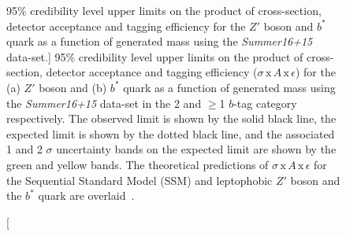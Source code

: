 \begin{figure}[!htb]
  \centering
  \captionsetup[subfigure]{aboveskip=0pt,justification=centering}
  \caption
      [95\% credibility level upper limits on the product of cross-section, detector acceptance and tagging efficiency
        for the $Z'$ boson and $b^*$ quark as a function of generated mass
        using the \textit{Summer16+15} data-set.]
      {95\% credibility level upper limits on
        the product of cross-section, detector acceptance and tagging efficiency ($\sigma\,\text{x}\,\mathit{A}\,\text{x}\,\epsilon$)
        for the (a) $Z'$ boson and (b) $b^*$ quark  as a function of generated mass
        using the \textit{Summer16+15} data-set in the 2 and $\geq$1 $b$-tag category respectively.
        The observed limit is shown by the solid black line,
        the expected limit is shown by the dotted black line,
        and the associated 1 and 2 $\sigma$ uncertainty bands on the expected limit are shown by the green and yellow bands.
        The theoretical predictions of $\sigma\,\text{x}\,\mathit{A}\,\text{x}\,\epsilon$
        for the Sequential Standard Model (SSM) and leptophobic $Z'$ boson and the $b^*$ quark are overlaid~\cite{dibjet-ichep_conf}.
      }
  \label{fig:lim-summer_benchmark}
\end{figure}

